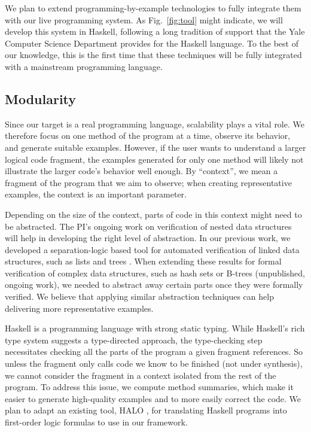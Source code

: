 We plan to extend programming-by-example technologies to fully integrate them with our live programming system. As Fig.~\ref{fig:tool} might indicate, we will develop this system in Haskell, following a long tradition of support that the Yale Computer Science Department provides for the Haskell language. To the best of our knowledge, this is the first time that these techniques will be fully integrated with a mainstream programming language.
%

\iffalse

\subsection{Modularity}

Since our target is a real programming language, scalability plays a vital role. We therefore focus on one method of the program at a time, observe its behavior, and generate suitable examples. However, if the user wants to understand a larger logical code fragment, the examples generated for only one method will likely not illustrate the larger code's behavior well enough. By ``context'', we mean a fragment of the program that we aim to observe; when creating representative examples, the context is an important parameter.

Depending on the size of the context, parts of code in this context might need to be abstracted. The PI's ongoing work on verification of nested data structures will help in developing the right level of abstraction. In our previous work, we developed a separation-logic based tool for automated verification of linked data structures, such as lists and trees \cite{PiskacWZ14, tacasPiskacWZ14, PiskacWZ13}. When extending these results for formal verification of complex data structures, such as hash sets or B-trees (unpublished, ongoing work), we needed to abstract away certain parts once they were formally verified. We believe that applying similar abstraction techniques can help delivering more representative examples.

Haskell is a programming language with strong static typing. While Haskell's rich type system suggests a type-directed approach, the type-checking step necessitates checking all the parts of the program a given fragment references. So unless the fragment only calls code we know to be finished (not under synthesis), we cannot consider the fragment in a context isolated from the rest of the program. To address this issue, we compute method summaries, which make it easier to generate high-quality examples and to more easily correct the code. We plan to adapt an existing tool, HALO \cite{VytiniotisJCR13}, for translating Haskell programs into first-order logic formulas to use in our framework.

